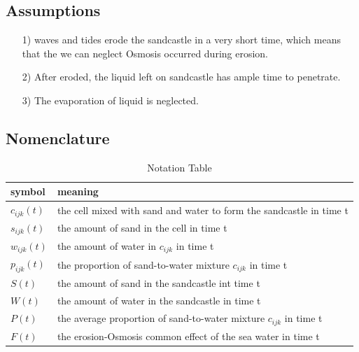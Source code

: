 \documentclass[12pt]{article}
\begin{document}
\subsection{Assumptions}
\begin{itemize}
    \item [1)]
          waves and tides erode the sandcastle in a very short time, which means that the we can neglect Osmosis occurred during erosion.
    \item [2)]
          After eroded, the liquid left on sandcastle has ample time to penetrate.
    \item [3)]
          The evaporation of liquid is neglected.
\end{itemize}
\subsection{Nomenclature}
\begin{table}[H]
    \caption{Notation Table}
    \vspace{10pt}
    \centering
    \begin{tabular}{ |l| p{5cm}| }
        \hline
        symbol       & meaning                                                             \\
        \hline
        $c_{ijk}(t)$ & the cell mixed with sand and water to form the sandcastle in time t \\
        $s_{ijk}(t)$ & the amount of sand in the cell in time t                            \\
        $w_{ijk}(t)$ & the amount of water in  $c_{ijk}$ in time t                         \\
        $p_{ijk}(t)$ & the proportion of sand-to-water mixture $c_{ijk}$ in time t         \\
        $S(t)$       & the amount of sand in the sandcastle	int time t                      \\
        $W(t)$       & the amount of water in the sandcastle in time t                     \\
        $P(t)$       & the average proportion of sand-to-water mixture $c_{ijk}$ in time t \\
        $F(t)$       & the erosion-Osmosis common effect of the sea water in time t        \\
        \hline
    \end{tabular}
    \label{bs1}
\end{table}
\end{document}
